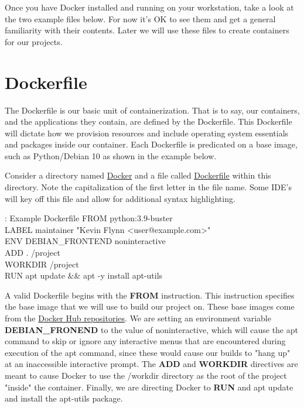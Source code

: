 \justify
Once you have Docker installed and running on your workstation, take a
look at the two example files below. For now it's OK to see them and get
a general familiarity with their contents. Later we will use these files
to create containers for our projects.

\section{Dockerfile}
\justify
The Dockerfile is our basic unit of containerization. That is to say,
our containers, and the applications they contain, are defined by the
Dockerfile. This Dockerfile will dictate how we provision resources and
include operating system essentials and packages inside our container.
Each Dockerfile is predicated on a base image, such as Python/Debian 10
as shown in the example below.

\justify
Consider a directory named
\href{https://github.com/hotpeppersec/rapid_secdev_framework/tree/master/docker}{Docker}
and a file called
\href{https://github.com/hotpeppersec/rapid_secdev_framework/blob/master/docker/Dockerfile}{Dockerfile}
within this directory. Note the capitalization of the first letter in the file name. Some IDE's will key off this file and allow for additional syntax highlighting.

\begin{mybox}{\thetcbcounter: Example Dockerfile}
FROM python:3.9-buster\\
LABEL maintainer "Kevin Flynn <user@example.com>"\\

ENV DEBIAN\_FRONTEND noninteractive\\

ADD . /project\\
WORKDIR /project\\

RUN apt update \&\& apt -y install apt-utils\\
\end{mybox}

\justify
A valid Dockerfile begins with the \textbf{FROM} instruction. This
instruction specifies the base image that we will use to build our
project on. These base images come from the
\href{https://docs.docker.com/docker-hub/repos/}{Docker Hub
  repositories}. We are setting an environment variable
\textbf{DEBIAN\_FRONEND} to the value of noninteractive, which will
cause the apt command to skip or ignore any interactive menus that are
encountered during execution of the apt command, since these would cause
our builds to "hang up" at an inaccessible interactive prompt. The
\textbf{ADD} and \textbf{WORKDIR} directives are meant to cause Docker
to use the /workdir directory as the root of the project "inside" the
container. Finally, we are directing Docker to \textbf{RUN} and apt
update and install the apt-utils package.


